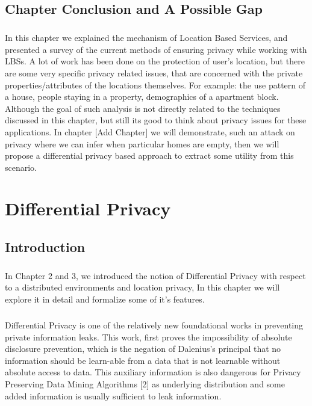 \documentclass[12pt]{report}
\theoremstyle{named}
\begin{document}
\section{Chapter Conclusion and A Possible Gap}
\paragraph{}
In this chapter we explained the mechanism of Location Based Services, and presented a survey of the current methods of ensuring privacy while working with LBSs. A lot of work has been done on the protection of user's location, but there are some very specific privacy related issues, that are concerned with the private properties/attributes of the locations themselves. For example: the use pattern of a house, people staying in a property, demographics of a apartment block. Although the goal of such analysis is not directly related to the techniques discussed in this chapter, but still its good to think about privacy issues for these applications. In chapter [Add Chapter] we will demonstrate, such an attack on privacy where we can infer when particular homes are empty, then we will propose a differential privacy based approach to extract some utility from this scenario.

\chapter{Differential Privacy}
\section{Introduction}
\paragraph{}
In Chapter 2 and 3, we introduced the notion of Differential Privacy with respect to a distributed environments and location privacy, In this chapter we will explore it in detail and formalize some of it's features. 

\paragraph{}
Differential Privacy \cite{Dwork:2006:DP:2097282.2097284} is one of the relatively new foundational works in preventing private information leaks. This work, first proves the impossibility of absolute disclosure prevention, which is the negation of Dalenius’s principal that no information should be learn-able from a data that is not learnable without absolute access to data. This auxiliary information is also dangerous for Privacy Preserving Data Mining Algorithms [2] as underlying distribution and some added information is usually sufficient to leak information.
\end{document}
